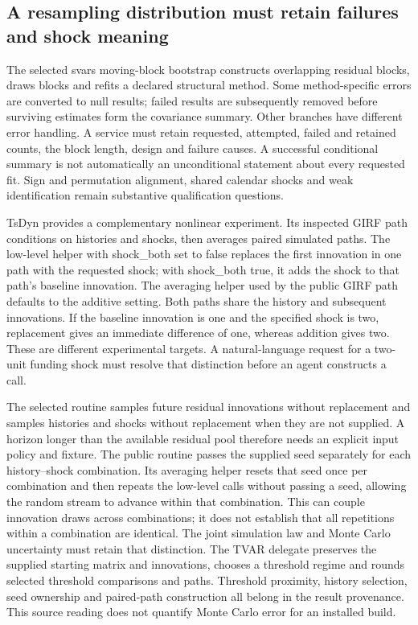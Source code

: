 \subsection{A resampling distribution must retain failures and shock meaning}

The selected svars moving-block bootstrap constructs overlapping residual blocks, draws blocks and refits a declared structural method. Some method-specific errors are converted to null results; failed results are subsequently removed before surviving estimates form the covariance summary. Other branches have different error handling. A service must retain requested, attempted, failed and retained counts, the block length, design and failure causes. A successful conditional summary is not automatically an unconditional statement about every requested fit. Sign and permutation alignment, shared calendar shocks and weak identification remain substantive qualification questions.~\citep{exec25_rdyn_svars}

TsDyn provides a complementary nonlinear experiment. Its inspected GIRF path conditions on histories and shocks, then averages paired simulated paths. The low-level helper with shock\_both set to false replaces the first innovation in one path with the requested shock; with shock\_both true, it adds the shock to that path's baseline innovation. The averaging helper used by the public GIRF path defaults to the additive setting. Both paths share the history and subsequent innovations. If the baseline innovation is one and the specified shock is two, replacement gives an immediate difference of one, whereas addition gives two. These are different experimental targets. A natural-language request for a two-unit funding shock must resolve that distinction before an agent constructs a call.~\citep{exec25_rdyn_tsdyn,exec25_rdyn_choice}

The selected routine samples future residual innovations without replacement and samples histories and shocks without replacement when they are not supplied. A horizon longer than the available residual pool therefore needs an explicit input policy and fixture. The public routine passes the supplied seed separately for each history--shock combination. Its averaging helper resets that seed once per combination and then repeats the low-level calls without passing a seed, allowing the random stream to advance within that combination. This can couple innovation draws across combinations; it does not establish that all repetitions within a combination are identical. The joint simulation law and Monte Carlo uncertainty must retain that distinction. The TVAR delegate preserves the supplied starting matrix and innovations, chooses a threshold regime and rounds selected threshold comparisons and paths. Threshold proximity, history selection, seed ownership and paired-path construction all belong in the result provenance. This source reading does not quantify Monte Carlo error for an installed build.~\citep{exec25_rdyn_tsdyn}

